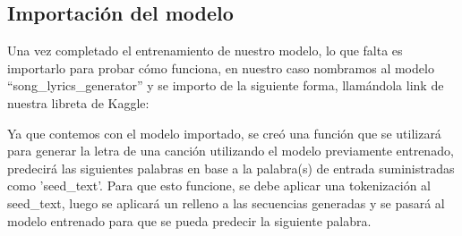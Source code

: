 \documentclass[12pt, a4paper, titlepage]{article}
\begin{document}
	\subsection{Importación del modelo}
	Una vez completado el entrenamiento de nuestro modelo, lo que falta es importarlo para probar cómo funciona, en nuestro caso nombramos al modelo “song\_lyrics\_generator” y se importo de la siguiente forma, llamándola link de nuestra libreta de Kaggle:
	\begin{center}
		
	\end{center}
	Ya que contemos con el modelo importado, se creó una función que se utilizará para generar la letra de una canción utilizando el modelo previamente entrenado, predecirá las siguientes palabras en base a la palabra(s) de entrada suministradas como 'seed\_text'. Para que esto funcione, se debe aplicar una tokenización al seed\_text, luego se aplicará un relleno a las secuencias generadas y se pasará al modelo entrenado para que se pueda predecir la siguiente palabra.
	\begin{center}
		
	\end{center}	
	\newpage
\end{document}
